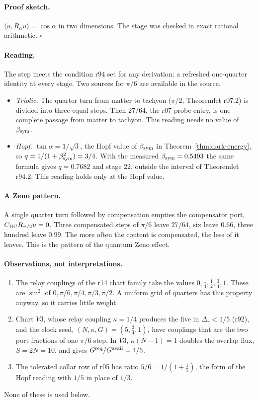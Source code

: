 \paragraph{Proof sketch.}
\(\langle u,R_\alpha u\rangle=\cos\alpha\) in two dimensions.  The stage was checked in exact rational arithmetic.
\(\square\)

\paragraph{Reading.}
The step meets the condition r94 set for any derivation: a refreshed one-quarter identity at every stage.  Two sources for
\(\pi/6\) are available in the source.
\begin{itemize}[leftmargin=2em]
\item \emph{Triolic.}  The quarter turn from matter to tachyon (\(\pi/2\), Theoremlet r07.2) is divided into three equal
steps.  Then \(27/64\), the r07 probe entry, is one complete passage from matter to tachyon.  This reading needs no value of
\(\beta_{\mathrm{sym}}\).
\item \emph{Hopf.}  \(\tan\alpha=1/\sqrt3\), the Hopf value of \(\beta_{\mathrm{sym}}\) in Theorem~\ref{thm:dark-energy}, so
\(q=1/(1+\beta_{\mathrm{sym}}^2)=3/4\).  With the measured \(\beta_{\mathrm{sym}}=0.5493\) the same formula gives \(q=0.7682\) and stage \(22\), outside the
interval of Theoremlet r94.2.  This reading holds only at the Hopf value.
\end{itemize}

\paragraph{A Zeno pattern.}
A single quarter turn followed by compensation empties the compensator port, \(C_{\mathrm{HC}}R_{\pi/2}u=0\).  Three compensated
steps of \(\pi/6\) leave \(27/64\), six leave \(0.66\), three hundred leave \(0.99\).  The more often the content is
compensated, the less of it leaves.  This is the pattern of the quantum Zeno effect.

\paragraph{Observations, not interpretations.}
\begin{enumerate}[leftmargin=2em]
\item The relay couplings of the r14 chart family take the values \(0,\tfrac14,\tfrac12,\tfrac34,1\).  These are
\(\sin^2\) of \(0,\pi/6,\pi/4,\pi/3,\pi/2\).  A uniform grid of quarters has this property anyway, so it carries little
weight.
\item Chart \(V3\), whose relay coupling \(\kappa=1/4\) produces the five in \(\Delta_\gamma<1/5\) (r92), and the clock seed,
\((N,\kappa,G)=(5,\tfrac34,1)\), have couplings that are the two port fractions of one \(\pi/6\) step.  In \(V3\),
\(\kappa(N-1)=1\) doubles the overlap flux, \(S=2N=10\), and gives \(G^{\rm req}/G^{\rm avail}=4/5\).
\item The tolerated collar row of r05 has ratio \(5/6=1/(1+\tfrac15)\), the form of the Hopf reading with \(1/5\) in place of
\(1/3\).
\end{enumerate}
None of these is used below.

